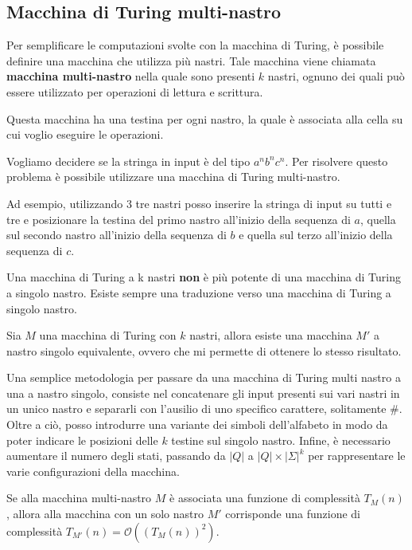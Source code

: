 \subsection{Macchina di Turing multi-nastro}
Per semplificare le computazioni svolte con la macchina di Turing, è possibile
definire una macchina che utilizza più nastri. Tale macchina viene chiamata
\textbf{macchina multi-nastro} nella quale sono presenti $k$ nastri, ognuno dei
quali può essere utilizzato per operazioni di lettura e scrittura.

Questa macchina ha una testina per ogni nastro, la quale è associata  alla cella
su cui voglio eseguire le operazioni.
\begin{esempio} 
    Vogliamo decidere se la stringa in input è del tipo $a^nb^nc^n$. Per
    risolvere questo problema è possibile utilizzare una macchina di Turing
    multi-nastro.

    Ad esempio, utilizzando 3 tre nastri posso inserire la stringa di input su
    tutti e tre e posizionare la testina del primo nastro all'inizio della
    sequenza di $a$, quella sul secondo nastro all'inizio della sequenza di $b$
    e quella sul terzo all'inizio della sequenza di $c$.
\end{esempio}
Una macchina di Turing a k nastri \textbf{non} è più potente di una macchina di
Turing a singolo nastro. Esiste sempre una traduzione verso una macchina di
Turing a singolo nastro.
\begin{teorema}
    Sia $M$ una macchina di Turing con $k$ nastri, allora esiste una macchina $M'$
    a nastro singolo equivalente, ovvero che mi permette di ottenere lo stesso
    risultato.
\end{teorema}
\begin{dimostrazione}
    Una semplice metodologia per passare da una macchina di Turing multi nastro
    a una a nastro singolo, consiste nel concatenare gli input presenti sui vari
    nastri in un unico nastro e separarli con l'ausilio di uno specifico
    carattere, solitamente $\#$. Oltre a ciò, posso introdurre una variante
    dei simboli dell'alfabeto in modo da poter indicare le posizioni delle $k$
    testine sul singolo nastro. Infine, è necessario aumentare il numero degli
    stati, passando da $|Q|$ a $|Q| \times |\Sigma|^k$ per rappresentare le
    varie configurazioni della macchina.
\end{dimostrazione}
\begin{teorema}
    Se alla macchina multi-nastro $M$ è associata una funzione di complessità
    $T_M(n)$, allora alla macchina con un solo nastro $M'$ corrisponde una
    funzione di complessità $T_{M'}(n) = \mathcal{O}((T_M(n))^2)$.
\end{teorema}
